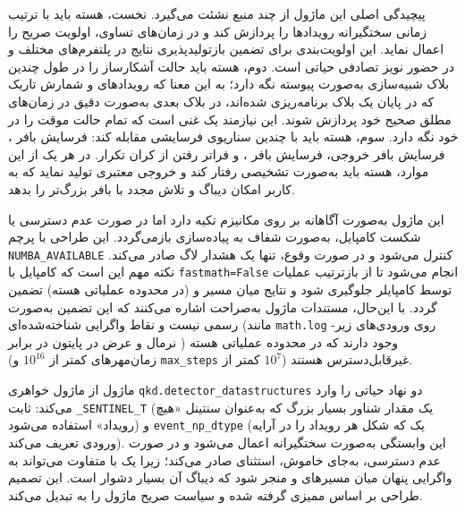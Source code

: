 پیچیدگی اصلی این ماژول از چند منبع نشئت می‌گیرد. نخست، هسته باید با ترتیب زمانی سختگیرانه رویدادها را پردازش کند و در زمان‌های تساوی، اولویت صریح  را اعمال نماید. این اولویت‌بندی برای تضمین بازتولیدپذیری  نتایج در پلتفرم‌های مختلف و در حضور نویز تصادفی حیاتی است. دوم، هسته باید حالت آشکارساز را در طول چندین بلاک شبیه‌سازی به‌صورت پیوسته نگه دارد؛ به این معنا که رویدادهای  و شمارش تاریک که در پایان یک بلاک برنامه‌ریزی شده‌اند، در بلاک بعدی به‌صورت دقیق در زمان‌های مطلق صحیح خود پردازش شوند. این نیازمند یک  غنی است که تمام حالت موقت را در خود نگه دارد. سوم، هسته باید با چندین سناریوی فرسایشی  مقابله کند: فرسایش بافر ، فرسایش بافر خروجی، فرسایش بافر ، و فراتر رفتن از کران تکرار. در هر یک از این موارد، هسته باید به‌صورت تشخیصی  رفتار کند و خروجی معتبری تولید نماید که به کاربر امکان دیباگ و تلاش مجدد با بافر بزرگ‌تر را بدهد.

این ماژول به‌صورت آگاهانه بر روی مکانیزم  تکیه دارد اما در صورت عدم دسترسی یا شکست کامپایل، به‌صورت شفاف به پیاده‌سازی  بازمی‌گردد. این طراحی  با پرچم \texttt{NUMBA\_AVAILABLE} کنترل می‌شود و در صورت وقوع، تنها یک هشدار لاگ صادر می‌کند. نکته مهم این است که کامپایل  با \texttt{fastmath=False} انجام می‌شود تا از بازترتیب عملیات  توسط کامپایلر جلوگیری شود و نتایج  میان مسیر  و  (در محدوده عملیاتی هسته) تضمین گردد. با این‌حال، مستندات ماژول به‌صراحت اشاره می‌کنند که این تضمین به‌صورت رسمی  نیست و نقاط واگرایی شناخته‌شده‌ای (مانند \texttt{math.log} روی ورودی‌های زیر-نرمال و عرض  در پایتون در برابر ) وجود دارند که در محدوده عملیاتی هسته (زمان‌مهرهای کمتر از $10^{16}$ و \texttt{max\_steps} کمتر از $10^{7}$) غیرقابل‌دسترس هستند.

ماژول از ماژول خواهری \texttt{qkd.detector\_datastructures} دو نهاد حیاتی را وارد می‌کند: ثابت \texttt{\_SENTINEL\_T} (یک مقدار شناور بسیار بزرگ که به‌عنوان سنتینل «هیچ رویداد» استفاده می‌شود) و \texttt{event\_np\_dtype} (یک  که شکل هر رویداد را در آرایه ورودی تعریف می‌کند). این وابستگی به‌صورت سختگیرانه اعمال می‌شود و در صورت عدم دسترسی، به‌جای  خاموش، استثنای  صادر می‌کند؛ زیرا یک  با  متفاوت می‌تواند به واگرایی پنهان میان مسیرهای  و  منجر شود که دیباگ آن بسیار دشوار است. این تصمیم طراحی بر اساس ممیزی  گرفته شده و سیاست صریح ماژول را به  تبدیل می‌کند.

